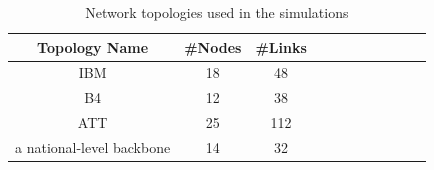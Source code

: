 \documentclass[sigconf]{acmart}
\begin{document}

\begin{table}
\centering
\caption{Network topologies used in the simulations}\label{evaluation-topologies}
\renewcommand{\arraystretch}{1.0}
\begin{tabular}{|c|c|c|c|c|c|c|c|c|c|c|} \hline
\setlength{\tabcolsep}{10pt}
\textbf{Topology Name}&\textbf{\#Nodes}&\textbf{\#Links}\\
\hline
IBM&18&48\\
\hline
B4&12&38\\
\hline
ATT&25&112\\
\hline
a national-level backbone&14&32\\
\hline
\end{tabular}
\end{table}
\end{document}

